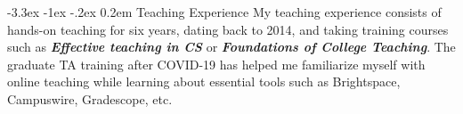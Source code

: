 \documentclass[10pt]{article}
\makeatletter
\def \section {%
    \@startsection {section}
    {1}%
    {\z@}%
    {-3.3ex \@plus -1ex \@minus -.2ex}%
    {0.2em}
    {\normalfont \Large \scshape \bfseries} %
    }
\def \paragraph {%
    \@startsection{paragraph}%
        {4}%
        \z@%
        {0.1em}
        {-\fontdimen 6 \font}%
        {\normalfont \bfseries}%
    }
\makeatother
\begin{document}



\section{Teaching Experience}
My teaching experience consists of hands-on teaching for six years, dating back to 2014, and taking training courses such as \textit{\textbf{Effective teaching in CS}} or \textit{\textbf{Foundations of College Teaching}}. 
The graduate TA training after COVID-19 has helped me familiarize myself with online teaching while learning about essential tools such as Brightspace, Campuswire, Gradescope, etc. 
\end{document}
